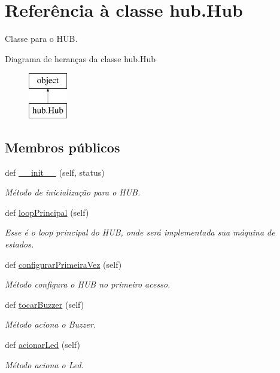 \hypertarget{classhub_1_1_hub}{}\section{Referência à classe hub.\+Hub}
\label{classhub_1_1_hub}


Classe para o H\+UB.  


Diagrama de heranças da classe hub.\+Hub\begin{figure}[H]
\begin{center}
\leavevmode
\includegraphics[height=2.000000cm]{classhub_1_1_hub}
\end{center}
\end{figure}
\subsection*{Membros públicos}
\begin{DoxyCompactItemize}
\item 
def \hyperlink{classhub_1_1_hub_a6927b78580ea47e1525a945e7d1da004}{\+\_\+\+\_\+init\+\_\+\+\_\+} (self, status)
\begin{DoxyCompactList}\small\item\em Método de inicialização para o H\+UB. \end{DoxyCompactList}\item 
def \hyperlink{classhub_1_1_hub_a27a1a63e552a3cf6a6229e655ef4e368}{loop\+Principal} (self)
\begin{DoxyCompactList}\small\item\em Esse é o loop principal do H\+UB, onde será implementada sua máquina de estados. \end{DoxyCompactList}\item 
def \hyperlink{classhub_1_1_hub_a32160e972d5ac2c695a3e86816113b95}{configurar\+Primeira\+Vez} (self)
\begin{DoxyCompactList}\small\item\em Método configura o H\+UB no primeiro acesso. \end{DoxyCompactList}\item 
def \hyperlink{classhub_1_1_hub_a9b81ca32890f6df8dece0e1ae497ee20}{tocar\+Buzzer} (self)
\begin{DoxyCompactList}\small\item\em Método aciona o Buzzer. \end{DoxyCompactList}\item 
def \hyperlink{classhub_1_1_hub_ac549b975878cf88b96dfbc57c319193e}{acionar\+Led} (self)
\begin{DoxyCompactList}\small\item\em Método aciona o Led. \end{DoxyCompactList}\end{DoxyCompactItemize}
